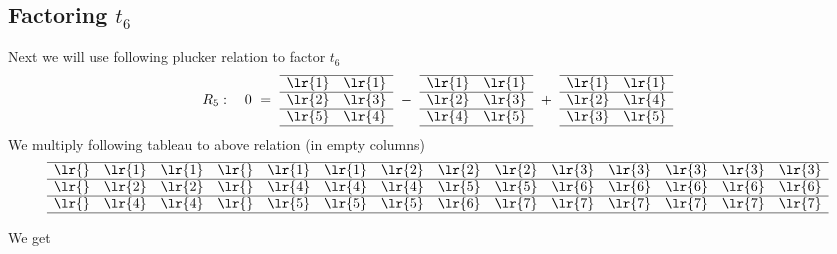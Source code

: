 \subsection{Factoring \(t_6\)}
Next we will use following plucker relation to factor \(t_6\)
\begin{align*}
R_5:\ \ \ 0\ =\ 
\begin{array}[c]{*{2}c}\cline{1-2}
\lr{1}&\lr{1}\\\cline{1-2}
\lr{2}&\lr{3}\\\cline{1-2}
\lr{5}&\lr{4}\\\cline{1-2}
\end{array}
\ -\ 
\begin{array}[c]{*{2}c}\cline{1-2}
\lr{1}&\lr{1}\\\cline{1-2}
\lr{2}&\lr{3}\\\cline{1-2}
\lr{4}&\lr{5}\\\cline{1-2}
\end{array}
\ +\ 
\begin{array}[c]{*{2}c}\cline{1-2}
\lr{1}&\lr{1}\\\cline{1-2}
\lr{2}&\lr{4}\\\cline{1-2}
\lr{3}&\lr{5}\\\cline{1-2}
\end{array}
\end{align*}
We multiply following tableau to above relation (in empty columns)
\[
\begin{array}[b]{*{14}c}\cline{1-14}
\lr{}&\lr{1}&\lr{1}&\lr{}&\lr{1}&\lr{1}&\lr{2}&\lr{2}&\lr{2}&\lr{3}&\lr{3}&\lr{3}&\lr{3}&\lr{3}\\\cline{1-14}
\lr{}&\lr{2}&\lr{2}&\lr{}&\lr{4}&\lr{4}&\lr{4}&\lr{5}&\lr{5}&\lr{6}&\lr{6}&\lr{6}&\lr{6}&\lr{6}\\\cline{1-14}
\lr{}&\lr{4}&\lr{4}&\lr{}&\lr{5}&\lr{5}&\lr{5}&\lr{6}&\lr{7}&\lr{7}&\lr{7}&\lr{7}&\lr{7}&\lr{7}\\\cline{1-14}
\end{array}    
\]
We get
